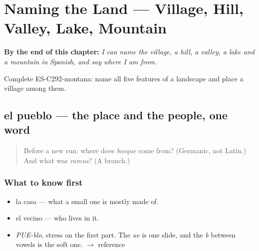 
\chapter{Naming the Land --- Village, Hill, Valley, Lake, Mountain}
\label{ch:la-tierra}

\begin{chapteropening}
\textbf{By the end of this chapter:} \emph{I can name the village, a hill, a valley, a lake and a mountain in Spanish, and say where I am from.}

Complete ES-C292-montana: name all five features of a landscape and place a village among them.
\end{chapteropening}

\section[el pueblo]{el pueblo — the place and the people, one word}

\label{lesson:ES-C292-pueblo}



\begin{quote}
Before a new run: where does \emph{bosque} come from? (Germanic, not Latin.) And what was \emph{ramus}? (A branch.)
\end{quote}

\subsection*{What to know first}
\begin{itemize}
\raggedright
  \item la casa — what a small one is mostly made of.
  \item el vecino — who lives in it.
\end{itemize}

\begin{sounds}
\begin{itemize}
\raggedright
  \item \emph{PUE-blo}, stress on the first part. The \emph{ue} is one slide, and the \emph{b} between vowels is the soft one. $\to$ reference
\end{itemize}
\end{sounds}

